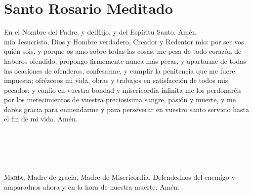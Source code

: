 \documentclass[./L00_main.tex]{subfiles}
\begin{document}
\chapter*{Santo Rosario Meditado}

\begin{minipage}[t]{0.475\textwidth}
      En el Nombre del Padre, y del{\redcross}Hijo, y del Espíritu Santo. Amén.\\

       mío Jesucristo, Dios y Hombre verdadero, Creador y Redentor mío: por ser vos quién sois, y porque os amo sobre todas las cosas,
      me pesa de todo corazón de haberos ofendido, propongo firmemente nunca más pecar, y apartarme de todas las ocasiones de ofenderos,
      confesarme, y cumplir la penitencia que me fuere impuesta; ofrézcoos mi vida, obras y trabajos en satisfacción de todos mis pecados;
      y confío en vuestra bondad y misericordia infinita me los perdonaréis por los merecimientos de vuestra preciosísima sangre, pasión y muerte,
      y me daréis gracia para enmendarme y para perseverar en vuestro santo servicio hasta el fin de mi vida. Amén.\\

      \\
      \\\\
      \\\\
      \textsc{María}, Madre de gracia, Madre de Misericordia. Defendednos del enemigo y amparadnos ahora y en la hora de nuestra muerte. Amén. 
\end{minipage}
\end{document}
